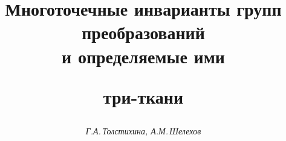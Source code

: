 






\newcommand{\const}{\operatorname{const}}


\newcommand{\tts}[1]{} 







\setcounter{page}{82}















\author{\it Г.А.\,Толстихина, А.М.\,Шелехов}




\title{Многоточечные инварианты групп преобразований\\ и определяемые ими


три-ткани}





\date{}




\pagestyle{plain} %







\maketitle


\label{begin}








